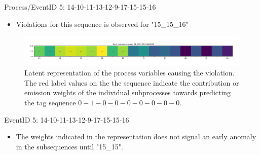 \documentclass{beamer}
\begin{document}
\begin{frame} %
\begin{block}{Process/EventID 5: 14-10-11-13-12-9-17-15-15-16}
		\begin{itemize}
                \scriptsize
				\item Violations for this sequence is observed for "15\_15\_16"
			\end{itemize}
\end{block}
\begin{figure}[!h]
            \includegraphics[scale = .23]{item_six.png}
            \centering
            \caption{\scriptsize Latent representation of the process variables causing the violation.  The red label values on the the sequence indicate the contribution or emission weights of the individual subprocesses towards predicting the tag sequence $0-1-0-0-0-0-0-0-0$.}
            \label{fig4}
\end{figure}
\begin{block}{EventID 5: 14-10-11-13-12-9-17-15-15-16}
		\begin{itemize}
            \scriptsize
			\item The weights indicated in the representation does not signal an early anomaly in the subsequences until "15\_15".
			\end{itemize}
\end{block}
\end{frame}
\end{document}
